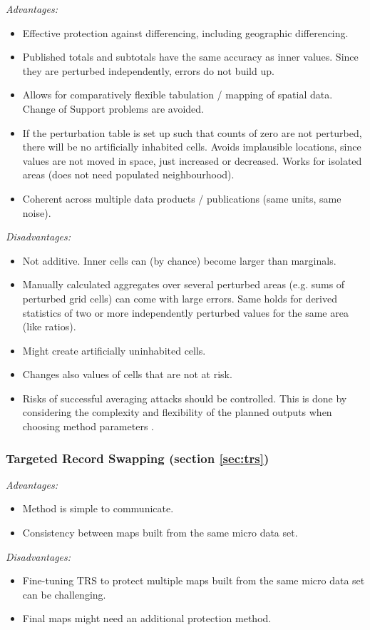 \noindent\emph{Advantages:}
\begin{itemize}
    \item Effective protection against differencing, including geographic differencing.
    \item Published totals and subtotals have the same accuracy as inner values. Since they are perturbed independently, errors do not build up.
    \item Allows for comparatively flexible tabulation / mapping of spatial data. Change of Support problems are avoided.
    \item If the perturbation table is set up such that counts of zero are not perturbed, there will be no artificially inhabited cells. Avoids implausible locations, since values are not moved in space, just increased or decreased. Works for isolated areas (does not need populated neighbourhood).
    \item Coherent across multiple data products / publications (same units, same noise).
\end{itemize}

\noindent\emph{Disadvantages:}
\begin{itemize}
    \item Not additive. Inner cells can (by chance) become larger than marginals.
    \item Manually calculated aggregates over several perturbed areas (e.g. sums of perturbed grid cells) can come with large errors. Same holds for derived statistics of two or more independently perturbed values for the same area (like ratios).
    \item Might create artificially uninhabited cells.
    \item Changes also values of cells that are not at risk.
    \item Risks of successful averaging attacks \citep{AsgharKaafar2020} should be controlled. This is done by considering the complexity and flexibility of the planned outputs when choosing method parameters \citep{Bach2022}.
\end{itemize}


\subsubsection{Targeted Record Swapping (section \ref{sec:trs})}

\noindent\emph{Advantages:}
\begin{itemize}
    \item Method is simple to communicate.
    \item Consistency between maps built from the same micro data set.
\end{itemize}

\noindent\emph{Disadvantages:}
\begin{itemize}
    \item Fine-tuning TRS to protect multiple maps built from the same micro data set can be challenging.
    \item Final maps might need an additional protection method.
\end{itemize}

\newpage
